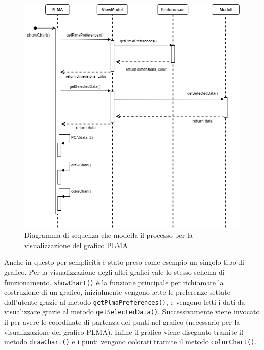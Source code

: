 \newpage
\begin{figure}[hb]
\includegraphics[width=15cm]{Images/Allegato Tecnico-Sequenza-PLMA}
\centering
\caption{Diagramma di sequenza che modella il processo per la visualizzazione del grafico PLMA}
\end{figure}
Anche in questo per semplicità è stato preso come esempio un singolo tipo di grafico. Per la visualizzazione degli altri grafici vale lo stesso schema di funzionamento.
\texttt{showChart()} è la funzione principale per richiamare la costruzione di un grafico, inizialmente vengono lette le preferenze settate dall'utente grazie al metodo \texttt{getPlmaPreferences()}, e vengono letti i dati da visualizzare grazie al metodo \texttt{getSelectedData()}. Successivamente viene invocato il  per avere le coordinate di partenza dei punti nel grafico (necessario per la visualizzazione del grafico PLMA). Infine il grafico viene disegnato tramite il metodo \texttt{drawChart()} e i punti vengono colorati tramite il metodo \texttt{colorChart()}.

\newpage